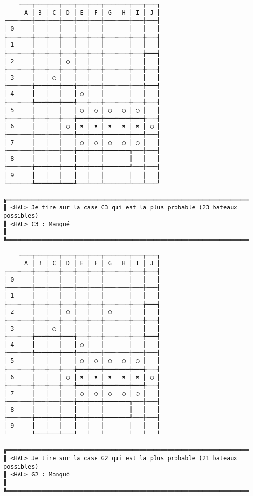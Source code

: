 {\scriptsize
\begin{verbatim}
    ┌───┬───┬───┬───┬───┬───┬───┬───┬───┬───┐
    │ A │ B │ C │ D │ E │ F │ G │ H │ I │ J │
┌───┼───┼───┼───┼───┼───┼───┼───┼───┼───┼───┤
│ 0 │   │   │   │   │   │   │   │   │   │   │
├───┼───┼───┼───┼───┼───┼───┼───┼───┼───┼───┤
│ 1 │   │   │   │   │   │   │   │   │   │   │
├───┼───┼───┼───┼───┼───┼───┼───┼───┼───╆━━━┪
│ 2 │   │   │   │ ◯ │   │   │   │   │   ┃   ┃
├───┼───┼───┼───┼───┼───┼───┼───┼───┼───╂───┨
│ 3 │   │   │ ◯ │   │   │   │   │   │   ┃   ┃
├───┼───╆━━━┿━━━┿━━━╅───┼───┼───┼───┼───╄━━━┩
│ 4 │   ┃   │   │   ┃ ◯ │   │   │   │   │   │
├───┼───╄━━━┿━━━┿━━━╃───┼───┼───┼───┼───┼───┤
│ 5 │   │   │   │   │ ◯ │ ◯ │ ◯ │ ◯ │ ◯ │   │
├───┼───┼───┼───┼───╆━━━┿━━━┿━━━┿━━━┿━━━╅───┤
│ 6 │   │   │   │ ◯ ┃ ✖ │ ✖ │ ✖ │ ✖ │ ✖ ┃ ◯ │
├───┼───┼───┼───┼───╄━━━┿━━━┿━━━┿━━━┿━━━╃───┤
│ 7 │   │   │   │   │ ◯ │ ◯ │ ◯ │ ◯ │ ◯ │   │
├───┼───┼───┼───┼───╆━━━┿━━━┿━━━┿━━━╅───┼───┤
│ 8 │   │   │   │   ┃   │   │   │   ┃   │   │
├───┼───╆━━━┿━━━┿━━━╋━━━┿━━━┿━━━┿━━━╃───┼───┤
│ 9 │   ┃   │   │   ┃   │   │   │   │   │   │
└───┴───┺━━━┷━━━┷━━━┹───┴───┴───┴───┴───┴───┘

╔══════════════════════════════════════════════════════════════════════════════════════════════════╗
║ <HAL> Je tire sur la case C3 qui est la plus probable (23 bateaux possibles)                     ║
║ <HAL> C3 : Manqué                                                                                ║
╚══════════════════════════════════════════════════════════════════════════════════════════════════╝
\end{verbatim}}
\newpage

{\scriptsize
\begin{verbatim}
    ┌───┬───┬───┬───┬───┬───┬───┬───┬───┬───┐
    │ A │ B │ C │ D │ E │ F │ G │ H │ I │ J │
┌───┼───┼───┼───┼───┼───┼───┼───┼───┼───┼───┤
│ 0 │   │   │   │   │   │   │   │   │   │   │
├───┼───┼───┼───┼───┼───┼───┼───┼───┼───┼───┤
│ 1 │   │   │   │   │   │   │   │   │   │   │
├───┼───┼───┼───┼───┼───┼───┼───┼───┼───╆━━━┪
│ 2 │   │   │   │ ◯ │   │   │ ◯ │   │   ┃   ┃
├───┼───┼───┼───┼───┼───┼───┼───┼───┼───╂───┨
│ 3 │   │   │ ◯ │   │   │   │   │   │   ┃   ┃
├───┼───╆━━━┿━━━┿━━━╅───┼───┼───┼───┼───╄━━━┩
│ 4 │   ┃   │   │   ┃ ◯ │   │   │   │   │   │
├───┼───╄━━━┿━━━┿━━━╃───┼───┼───┼───┼───┼───┤
│ 5 │   │   │   │   │ ◯ │ ◯ │ ◯ │ ◯ │ ◯ │   │
├───┼───┼───┼───┼───╆━━━┿━━━┿━━━┿━━━┿━━━╅───┤
│ 6 │   │   │   │ ◯ ┃ ✖ │ ✖ │ ✖ │ ✖ │ ✖ ┃ ◯ │
├───┼───┼───┼───┼───╄━━━┿━━━┿━━━┿━━━┿━━━╃───┤
│ 7 │   │   │   │   │ ◯ │ ◯ │ ◯ │ ◯ │ ◯ │   │
├───┼───┼───┼───┼───╆━━━┿━━━┿━━━┿━━━╅───┼───┤
│ 8 │   │   │   │   ┃   │   │   │   ┃   │   │
├───┼───╆━━━┿━━━┿━━━╋━━━┿━━━┿━━━┿━━━╃───┼───┤
│ 9 │   ┃   │   │   ┃   │   │   │   │   │   │
└───┴───┺━━━┷━━━┷━━━┹───┴───┴───┴───┴───┴───┘

╔══════════════════════════════════════════════════════════════════════════════════════════════════╗
║ <HAL> Je tire sur la case G2 qui est la plus probable (21 bateaux possibles)                     ║
║ <HAL> G2 : Manqué                                                                                ║
╚══════════════════════════════════════════════════════════════════════════════════════════════════╝
\end{verbatim}}
\newpage

